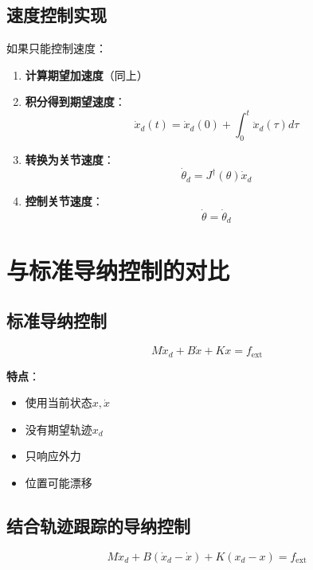 \documentclass[12pt,a4paper]{article}
\begin{document}
\subsection{速度控制实现}

如果只能控制速度：

\begin{enumerate}
\item \textbf{计算期望加速度}（同上）
\item \textbf{积分得到期望速度}：
\begin{equation}
\dot{x}_d(t) = \dot{x}_d(0) + \int_0^t \ddot{x}_d(\tau) d\tau
\end{equation}
\item \textbf{转换为关节速度}：
\begin{equation}
\dot{\theta}_d = J^{\dagger}(\theta)\dot{x}_d
\end{equation}
\item \textbf{控制关节速度}：
\begin{equation}
\dot{\theta} = \dot{\theta}_d
\end{equation}
\end{enumerate}

\section{与标准导纳控制的对比}

\subsection{标准导纳控制}

\begin{equation}
M\ddot{x}_d + B\dot{x} + Kx = f_{\text{ext}}
\end{equation}

\textbf{特点}：
\begin{itemize}
\item 使用当前状态$x, \dot{x}$
\item 没有期望轨迹$x_d$
\item 只响应外力
\item 位置可能漂移
\end{itemize}

\subsection{结合轨迹跟踪的导纳控制}

\begin{equation}
M\ddot{x}_d + B(\dot{x}_d - \dot{x}) + K(x_d - x) = f_{\text{ext}}
\end{equation}
\end{document}
